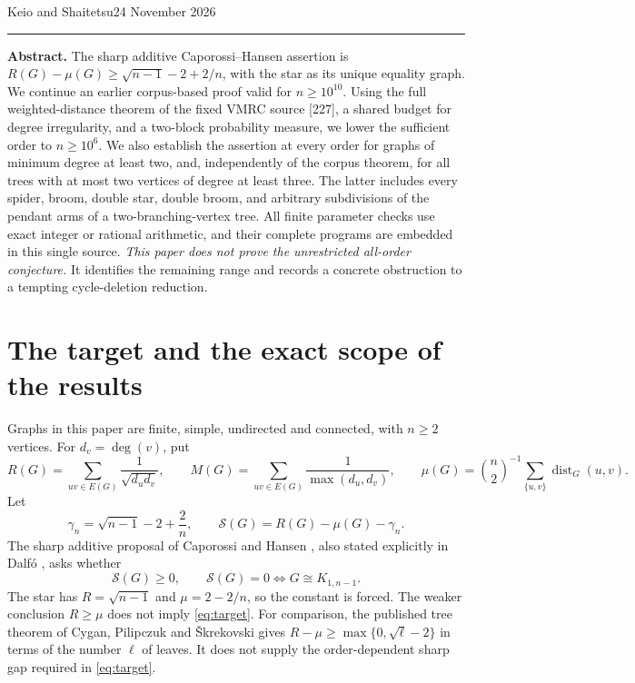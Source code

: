 \documentclass[11pt,a4paper]{article}
\theoremstyle{remark}\newtheorem{remark}[theorem]{Remark}
\DeclareMathOperator{\dist}{dist}
\begin{document}
\thispagestyle{plain}
\par
\vspace{9pt}
\par
\vspace{6pt}
\par
\vspace{9pt}
\noindent Keio and Shaitetsu\hfill 24 November 2026\par
\vspace{10pt}\hrule\vspace{10pt}
\noindent\textbf{Abstract.}
The sharp additive Caporossi--Hansen assertion is
$R(G)-\mu(G)\ge\sqrt{n-1}-2+2/n$, with the star as its unique equality
graph. We continue an earlier corpus-based proof valid for $n\ge10^{10}$.
Using the full weighted-distance theorem of the fixed VMRC source [227],
a shared budget for degree irregularity, and a two-block probability
measure, we lower the sufficient order to $n\ge10^6$.
We also establish the assertion at every order for graphs of minimum
degree at least two, and, independently of the corpus theorem, for all
trees with at most two vertices of degree at least three.
The latter includes every spider, broom, double star, double broom,
and arbitrary subdivisions of the pendant arms of a two-branching-vertex tree.
All finite parameter checks use exact integer or rational arithmetic,
and their complete programs are embedded in this single source.
\emph{This paper does not prove the unrestricted all-order conjecture.}
It identifies the remaining range and records a concrete obstruction to
a tempting cycle-deletion reduction.

\section{The target and the exact scope of the results}

Graphs in this paper are finite, simple, undirected and connected, with
$n\ge2$ vertices. For $d_v=\deg(v)$, put
\[
 R(G)=\sum_{uv\in E(G)}\frac1{\sqrt{d_ud_v}},\qquad
 M(G)=\sum_{uv\in E(G)}\frac1{\max(d_u,d_v)},\qquad
 \mu(G)=\binom n2^{-1}\sum_{\{u,v\}}\dist_G(u,v).
\]
Let
\[
 \gamma_n=\sqrt{n-1}-2+\frac2n,
 \qquad \mathcal S(G)=R(G)-\mu(G)-\gamma_n.
\]
The sharp additive proposal of Caporossi and Hansen \cite{cap}, also
stated explicitly in Dalf\'o \cite{dalfo}, asks whether
\begin{equation}\label{eq:target}\tag{CH}
 \mathcal S(G)\ge0,
 \qquad\mathcal S(G)=0\Longleftrightarrow G\cong K_{1,n-1}.
\end{equation}
The star has $R=\sqrt{n-1}$ and $\mu=2-2/n$, so the constant is forced.
The weaker conclusion $R\ge\mu$ does not imply \eqref{eq:target}.
For comparison, the published tree theorem of Cygan, Pilipczuk and
\v Skrekovski \cite{cygan} gives $R-\mu\ge\max\{0,\sqrt\ell-2\}$
in terms of the number $\ell$ of leaves. It does not supply the
order-dependent sharp gap required in \eqref{eq:target}.
\end{document}
